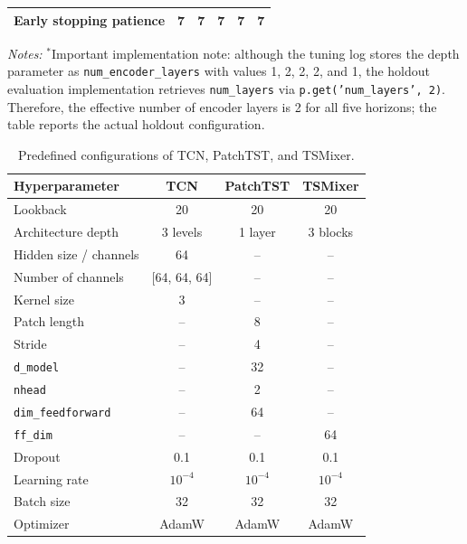 \documentclass[12pt,twoside]{ord}
\begin{document}
\begin{table}[htbp]
\begin{tabular}{lrrrrr}
Early stopping patience & 7       & 7       & 7       & 7       & 7 \\
\hline
\end{tabular}
\par\vspace{4pt}\parbox{\linewidth}{\fontsize{9pt}{12pt}\selectfont\textit{Notes:} $^{\ast}$Important implementation note: although the tuning log stores the depth parameter as \texttt{num\_encoder\_layers} with values 1, 2, 2, 2, and 1, the holdout evaluation implementation retrieves \texttt{num\_layers} via \texttt{p.get('num\_layers', 2)}. Therefore, the effective number of encoder layers is 2 for all five horizons; the table reports the actual holdout configuration.}
\end{table}

\begin{table}[htbp]
\centering
\caption{Predefined configurations of TCN, PatchTST, and TSMixer.}\label{tab:config_dl_predefined}
\setlength{\tabcolsep}{6pt}
\begin{tabular}{lccc}
\hline
Hyperparameter & TCN & PatchTST & TSMixer \\
\hline
Lookback                & 20           & 20      & 20 \\
Architecture depth      & 3 levels     & 1 layer & 3 blocks \\
Hidden size / channels  & 64           & --      & -- \\
Number of channels      & [64, 64, 64] & --      & -- \\
Kernel size             & 3            & --      & -- \\
Patch length            & --           & 8       & -- \\
Stride                  & --           & 4       & -- \\
\texttt{d\_model}       & --           & 32      & -- \\
\texttt{nhead}          & --           & 2       & -- \\
\texttt{dim\_feedforward} & --         & 64      & -- \\
\texttt{ff\_dim}        & --           & --      & 64 \\
Dropout                 & 0.1          & 0.1     & 0.1 \\
Learning rate           & $10^{-4}$    & $10^{-4}$ & $10^{-4}$ \\
Batch size              & 32           & 32      & 32 \\
Optimizer               & AdamW        & AdamW   & AdamW \\

\end{tabular}
\end{table}
\end{document}
